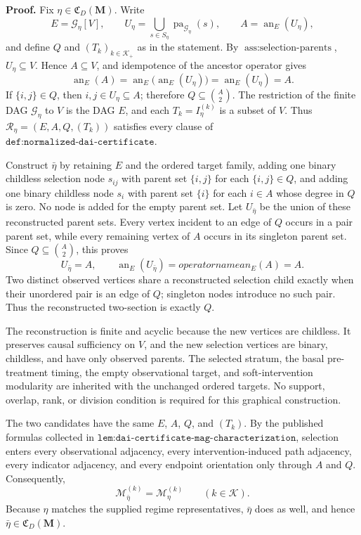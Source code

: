 \textbf{Proof.}
Fix \(\eta\in\mathfrak C_D(\mathbf M)\).  Write
\[
E=\mathcal G_\eta[V],\qquad
U_\eta=\bigcup_{s\in S_\eta}\operatorname{pa}_{\mathcal G_\eta}(s),\qquad
A=\operatorname{an}_E(U_\eta),
\]
and define \(Q\) and \((T_k)_{k\in\mathcal K_+}\) as in the statement.  By \(\operatorname{ass{:}selection\text{-}parents}\), \(U_\eta\subseteq V\).  Hence \(A\subseteq V\), and idempotence of the ancestor operator gives
\[
\operatorname{an}_E(A)
=\operatorname{an}_E\!\bigl(\operatorname{an}_E(U_\eta)\bigr)
=\operatorname{an}_E(U_\eta)
=A.
\]
If \(\{i,j\}\in Q\), then \(i,j\in U_\eta\subseteq A\); therefore \(Q\subseteq\binom A2\).  The restriction of the finite DAG \(\mathcal G_\eta\) to \(V\) is the DAG \(E\), and each \(T_k=I_\eta^{(k)}\) is a subset of \(V\).  Thus \(\mathcal R_\eta=(E,A,Q,(T_k))\) satisfies every clause of \(\texttt{def:normalized-dai-certificate}\).

Construct \(\bar\eta\) by retaining \(E\) and the ordered target family, adding one binary childless selection node \(s_{ij}\) with parent set \(\{i,j\}\) for each \(\{i,j\}\in Q\), and adding one binary childless node \(s_i\) with parent set \(\{i\}\) for each \(i\in A\) whose degree in \(Q\) is zero.  No node is added for the empty parent set.  Let \(U_{\bar\eta}\) be the union of these reconstructed parent sets.  Every vertex incident to an edge of \(Q\) occurs in a pair parent set, while every remaining vertex of \(A\) occurs in its singleton parent set.  Since \(Q\subseteq\binom A2\), this proves
\[
U_{\bar\eta}=A,
\qquad
\operatorname{an}_E(U_{\bar\eta})=operatorname{an}_E(A)=A.
\]
Two distinct observed vertices share a reconstructed selection child exactly when their unordered pair is an edge of \(Q\); singleton nodes introduce no such pair.  Thus the reconstructed two-section is exactly \(Q\).

The reconstruction is finite and acyclic because the new vertices are childless.  It preserves causal sufficiency on \(V\), and the new selection vertices are binary, childless, and have only observed parents.  The selected stratum, the basal pre-treatment timing, the empty observational target, and soft-intervention modularity are inherited with the unchanged ordered targets.  No support, overlap, rank, or division condition is required for this graphical construction.

The two candidates have the same \(E\), \(A\), \(Q\), and \((T_k)\).  By the published formulas collected in \(\texttt{lem:dai-certificate-mag-characterization}\), selection enters every observational adjacency, every intervention-induced path adjacency, every indicator adjacency, and every endpoint orientation only through \(A\) and \(Q\).  Consequently,
\[
\mathcal M_{\bar\eta}^{(k)}=\mathcal M_\eta^{(k)}
\qquad(k\in\mathcal K).
\]
Because \(\eta\) matches the supplied regime representatives, \(\bar\eta\) does as well, and hence \(\bar\eta\in\mathfrak C_D(\mathbf M)\).

